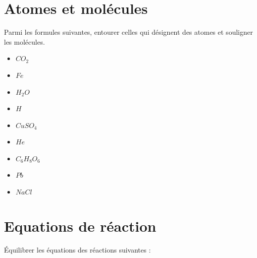 \documentclass[a4paper,11pt]{exam}
\begin{document}
\section{Atomes et molécules}

Parmi les formules suivantes, entourer celles qui désignent des atomes et souligner les molécules.

\begin{multicols}{3}
	\begin{itemize}
		\item $CO_2$
		\item $Fe$
		\item $H_2O$
		\item $H$
		\item $CuSO_4$
		\item $He$
		\item $C_6H_8O_6 $
		\item $Pb$
		\item $NaCl$
		
	\end{itemize}
\end{multicols}


\section{Equations de réaction}

\'Equilibrer les équations des réactions suivantes :
\end{document}
